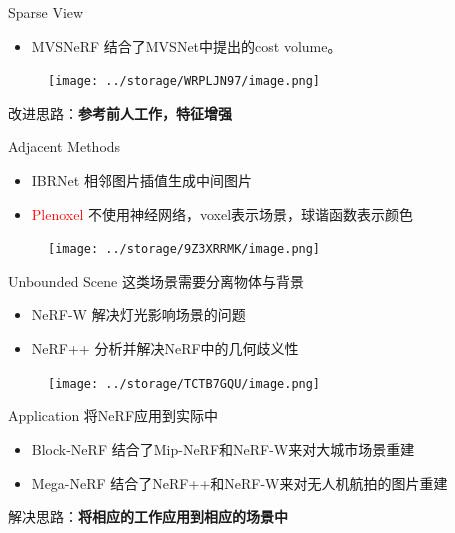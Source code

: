 \documentclass[dark]{sintefbeamer}
\begin{document}
\begin{frame}[fragile]{Sparse View}

  \begin{itemize}
    \item MVSNeRF\cite{chenMVSNeRFFastGeneralizable2021} \quad 结合了MVSNet\cite{yaoMVSNetDepthInference2018}中提出的cost volume。
  \end{itemize}

  \begin{figure}
    \texttt{[image: ../storage/WRPLJN97/image.png]}
  \end{figure}
    
  改进思路：\textbf{参考前人工作，特征增强}
  
\end{frame}

\begin{frame}[fragile]{Adjacent Methods}

  \begin{itemize}
    \item IBRNet\cite{wangIBRNetLearningMultiView2021} \quad 相邻图片插值生成中间图片
    \item \textcolor{red}{Plenoxel}\cite{yuPlenoxelsRadianceFields2021} \quad 不使用神经网络，voxel表示场景，球谐函数表示颜色
  \end{itemize}

  \begin{figure}
    \texttt{[image: ../storage/9Z3XRRMK/image.png]}
  \end{figure}
  
\end{frame}

\begin{frame}[fragile]{Unbounded Scene}
  这类场景需要分离物体与背景

  \begin{itemize}
    \item NeRF-W\cite{martin-bruallaNeRFWildNeural2021} \quad 解决灯光影响场景的问题
    \item NeRF++\cite{zhangNeRFAnalyzingImproving2020} \quad 分析并解决NeRF中的几何歧义性
  \end{itemize}

  \begin{figure}
    \texttt{[image: ../storage/TCTB7GQU/image.png]}
  \end{figure}
  
\end{frame}

\begin{frame}[fragile]{Application}
  将NeRF应用到实际中

  \begin{itemize}
    \item Block-NeRF\cite{tancikBlockNeRFScalableLarge2022} \quad 结合了Mip-NeRF和NeRF-W来对大城市场景重建
    \item Mega-NeRF\cite{turkiMegaNeRFScalableConstruction2022} \quad 结合了NeRF++和NeRF-W来对无人机航拍的图片重建
  \end{itemize}

  解决思路：\textbf{将相应的工作应用到相应的场景中}
  
\end{frame}
\end{document}
